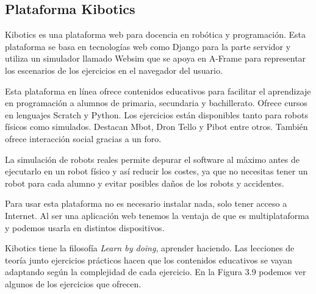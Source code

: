 \subsection{Plataforma Kibotics}

Kibotics es una plataforma web para docencia en robótica y programación. Esta plataforma se basa en tecnologías web como Django para la parte servidor y utiliza un simulador llamado Websim que se apoya en A-Frame para representar los escenarios de los ejercicios en el navegador del usuario.

Esta plataforma en línea ofrece contenidos educativos para facilitar el aprendizaje en programación a alumnos de primaria, secundaria y bachillerato. Ofrece cursos en lenguajes Scratch y Python. Los ejercicios están disponibles tanto para robots físicos como simulados. Destacan Mbot, Dron Tello y Pibot entre otros.
También ofrece interacción social gracias a un foro.

La simulación de robots reales permite  depurar el software al máximo antes de ejecutarlo en un robot físico y así reducir los costes, ya que no necesitas tener un robot para cada alumno y evitar  posibles daños de los robots y accidentes.

Para usar esta plataforma no es necesario instalar nada, solo tener acceso a Internet. Al ser una aplicación web tenemos la ventaja de que es multiplataforma y podemos usarla en distintos dispositivos.

Kibotics tiene la filosofía \textit{Learn by doing}, aprender haciendo. Las lecciones de teoría junto ejercicios prácticos hacen que los contenidos educativos se vayan adaptando según la complejidad de cada ejercicio. En la Figura 3.9 podemos ver algunos de los ejercicios que ofrecen.

